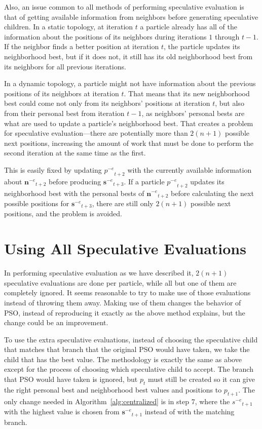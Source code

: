 \documentclass[conference,letterpaper]{IEEEtran}
\newcommand{\alg}[1]{Algorithm~\ref{alg:#1}}
\providecommand{\noeval}[1]{\ensuremath{#1^{-e}}}
\providecommand{\p}{\ensuremath{p}}
\providecommand{\s}{\ensuremath{s}}
\providecommand{\sset}{\ensuremath{\mathbf{s}}}
\providecommand{\nset}{\ensuremath{\mathbf{n}}}
\begin{document}
Also, an issue common to all methods of performing speculative evaluation is
that of getting available information from neighbors before generating
speculative children.  In a static topology, at iteration $t$ a particle
already has all of the information about the positions of its neighbors during
iterations $1$ through $t-1$.  If the neighbor finds a better position at 
iteration $t$, the particle updates its neighborhood best, but if it does not,
it still has its old neighborhood best from its neighbors for all previous 
iterations.

In a dynamic topology, a particle might not have information about the previous
positions of its neighbors at iteration $t$.  That means that its new
neighborhood best could come not only from its neighbors' positions at
iteration $t$, but also from their personal best from iteration $t-1$, as
neighbors' personal bests are what are used to update a particle's neighborhood
best.  That creates a problem for speculative evaluation---there are
potentially more than $2(n+1)$ possible next positions, increasing the amount
of work that must be done to perform the second iteration at the same time as
the first.

This is easily fixed by updating $\noeval{\p}_{t+2}$ with the currently
available information about $\noeval{\nset}_{t+2}$ before producing
$\noeval{\sset}_{t+3}$.  If a particle $\noeval{\p}_{t+2}$ updates its 
neighborhood best with the personal bests of $\noeval{\nset}_{t+2}$ before
calculating the next possible positions for $\noeval{\sset}_{t+3}$, there are
still only $2(n+1)$ possible next positions, and the problem is avoided.

\section{Using All Speculative Evaluations}
\label{sec:extra}

In performing speculative evaluation as we have described it, $2(n+1)$
speculative evaluations are done per particle, while all but one of them are
completely ignored.  It seems reasonable to try to make use of those
evaluations instead of throwing them away.  Making use of them changes the
behavior of PSO, instead of reproducing it exactly as the above method
explains, but the change could be an improvement.

To use the extra speculative evaluations, instead of choosing the speculative
child that matches that branch that the original PSO would have taken, we take
the child that has the best value.  The methodology is exactly the same as
above except for the process of choosing which speculative child to accept.
The branch that PSO would have taken is ignored, but $\p_t$ must still be
created so it can give the right personal best and neighborhood best values and
positions to $\p_{t+1}$.  The only change needed in \alg{centralized} is in
step 7, where the $\noeval{\s}_{t+1}$ with the highest value is chosen from
$\noeval{\sset}_{t+1}$ instead of with the matching branch.
\end{document}
